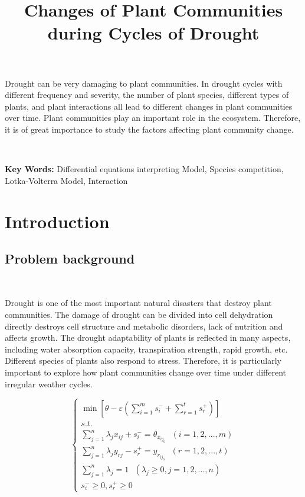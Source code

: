 \documentclass{headFile3}
\title{\bfseries {\large Changes of Plant Communities during Cycles of Drought}
}
\begin{document}
\vspace*{0.5em}
\begin{summary}

Drought can be very damaging to plant communities. In drought cycles with different frequency and severity, the number of plant species, different types of plants, and plant interactions all lead to different changes in plant communities over time. Plant communities play an important role in the ecosystem. Therefore, it is of great importance to study the factors affecting plant community change.

\

\noindent \textbf{Key Words:} Differential equations interpreting Model, Species competition, Lotka-Volterra Model, Interaction

\end{summary}

\maketitle
\newpage
\tableofcontents
\newpage
\setcounter{page}{1}


\section{Introduction}
\subsection{Problem background}
\

Drought is one of the most important natural disasters that destroy plant communities. The damage of drought can be divided into cell dehydration directly destroys cell structure and metabolic disorders, lack of nutrition and affects growth. The drought adaptability of plants is reflected in many aspects, including water absorption capacity, transpiration strength, rapid growth, etc. Different species of plants also respond to stress. Therefore, it is particularly important to explore how plant communities change over time under different irregular weather cycles.
\begin{large}
\begin{equation}
\begin{cases}
    \min[\theta-\varepsilon(\sum\limits_{i=1}^{m}s_{i}^{-}+\sum\limits_{r=1}^{t}s_{r}^{+})]
    \\
    s.t.
    \\
    \sum\limits_{j=1}^{n}\lambda_jx_{ij}+s_{i}^{-}=\theta_{x_{ij_0}}\ \ \ (i=1,2,...,m)
    \\
    \sum\limits_{j=1}^{n}\lambda_jy_{rj}-s_{r}^{+}=y_{r_{ij_0}}\ \ \ (r=1,2,...,t)
    \\
    \sum\limits_{j=1}^{n}\lambda_j=1\ \ \ (\lambda_j\geqslant0,j=1,2,...,n)
    \\
    s_{i}^{-}\geqslant0,s_{r}^{+}\geqslant0
\end{cases}
\end{equation}
\end{large}
\end{document}
